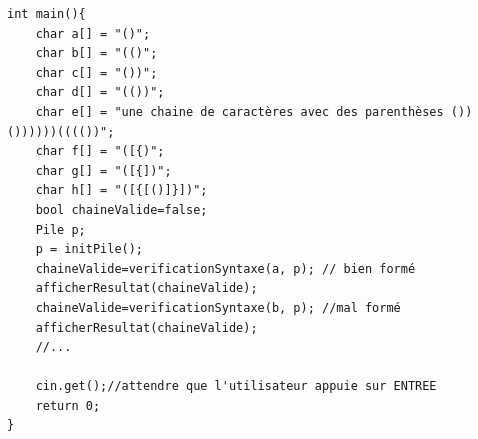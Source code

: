 \documentclass[french]{article}
\begin{document}
\begin{lstlisting}[caption={Exemple de main pour verifier la syntaxe},label=main]
int main(){
    char a[] = "()";
    char b[] = "(()";
    char c[] = "())";
    char d[] = "(())";
    char e[] = "une chaine de caractères avec des parenthèses ())())))))(((())";
    char f[] = "([{)";
    char g[] = "([{])";
    char h[] = "([{[()]}])";
    bool chaineValide=false;
    Pile p;
    p = initPile();
    chaineValide=verificationSyntaxe(a, p); // bien formé
    afficherResultat(chaineValide);
    chaineValide=verificationSyntaxe(b, p); //mal formé
    afficherResultat(chaineValide);
    //...
    
    cin.get();//attendre que l'utilisateur appuie sur ENTREE
    return 0;
}
\end{lstlisting}
\end{document}
